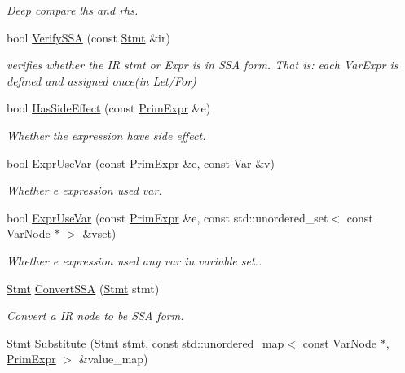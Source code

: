 \begin{DoxyCompactItemize}
\begin{DoxyCompactList}\small\item\em Deep compare lhs and rhs. \end{DoxyCompactList}\item 
bool \hyperlink{namespacetvm_1_1tir_ae4506ebe76b8f44653dafdf0aef263f1}{Verify\+S\+SA} (const \hyperlink{classtvm_1_1tir_1_1Stmt}{Stmt} \&ir)
\begin{DoxyCompactList}\small\item\em verifies whether the IR stmt or Expr is in S\+SA form. That is\+: each Var\+Expr is defined and assigned once(in Let/\+For) \end{DoxyCompactList}\item 
bool \hyperlink{namespacetvm_1_1tir_a93a2b6c1ea585d4cfd12539e65f48fdb}{Has\+Side\+Effect} (const \hyperlink{classtvm_1_1PrimExpr}{Prim\+Expr} \&e)
\begin{DoxyCompactList}\small\item\em Whether the expression have side effect. \end{DoxyCompactList}\item 
bool \hyperlink{namespacetvm_1_1tir_a2a95f59679b6acbb47ab488a1e2c6b09}{Expr\+Use\+Var} (const \hyperlink{classtvm_1_1PrimExpr}{Prim\+Expr} \&e, const \hyperlink{classtvm_1_1tir_1_1Var}{Var} \&v)
\begin{DoxyCompactList}\small\item\em Whether e expression used var. \end{DoxyCompactList}\item 
bool \hyperlink{namespacetvm_1_1tir_ae82ce8b3c5f0cd3a8213b90153637177}{Expr\+Use\+Var} (const \hyperlink{classtvm_1_1PrimExpr}{Prim\+Expr} \&e, const std\+::unordered\+\_\+set$<$ const \hyperlink{classtvm_1_1tir_1_1VarNode}{Var\+Node} $\ast$ $>$ \&vset)
\begin{DoxyCompactList}\small\item\em Whether e expression used any var in variable set.. \end{DoxyCompactList}\item 
\hyperlink{classtvm_1_1tir_1_1Stmt}{Stmt} \hyperlink{namespacetvm_1_1tir_afdbcd71b66872684f3dc873b9380520f}{Convert\+S\+SA} (\hyperlink{classtvm_1_1tir_1_1Stmt}{Stmt} stmt)
\begin{DoxyCompactList}\small\item\em Convert a IR node to be S\+SA form. \end{DoxyCompactList}\item 
\hyperlink{classtvm_1_1tir_1_1Stmt}{Stmt} \hyperlink{namespacetvm_1_1tir_a4b122873fd63b721684ffb4cd9913bb4}{Substitute} (\hyperlink{classtvm_1_1tir_1_1Stmt}{Stmt} stmt, const std\+::unordered\+\_\+map$<$ const \hyperlink{classtvm_1_1tir_1_1VarNode}{Var\+Node} $\ast$, \hyperlink{classtvm_1_1PrimExpr}{Prim\+Expr} $>$ \&value\+\_\+map)

\end{DoxyCompactItemize}
